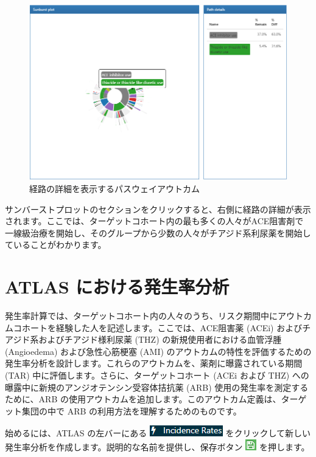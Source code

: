 \documentclass[
  11pt]{book}
\theoremstyle{definition}
\theoremstyle{definition}
\theoremstyle{definition}
\theoremstyle{definition}
\theoremstyle{remark}
\begin{document}
\begin{figure}

{\centering \includegraphics[width=1\linewidth]{images/Characterization/atlasPathwaysResultsPathDetails} 

}

\caption{経路の詳細を表示するパスウェイアウトカム}\label{fig:atlasPathwaysResultsPathDetails}
\end{figure}

サンバーストプロットのセクションをクリックすると、右側に経路の詳細が表示されます。ここでは、ターゲットコホート内の最も多くの人々がACE阻害剤で一線級治療を開始し、そのグループから少数の人々がチアジド系利尿薬を開始していることがわかります。

\section{ATLAS における発生率分析}\label{atlas-ux306bux304aux3051ux308bux767aux751fux7387ux5206ux6790}

発生率計算では、ターゲットコホート内の人々のうち、リスク期間中にアウトカムコホートを経験した人を記述します。ここでは、ACE阻害薬 (ACEi) およびチアジド系およびチアジド様利尿薬 (THZ) の新規使用者における血管浮腫 (Angioedema) および急性心筋梗塞 (AMI) のアウトカムの特性を評価するための発生率分析を設計します。これらのアウトカムを、薬剤に曝露されている期間 (TAR) 中に評価します。さらに、ターゲットコホート (ACEi および THZ) への曝露中に新規のアンジオテンシン受容体拮抗薬 (ARB) 使用の発生率を測定するために、ARB の使用アウトカムを追加します。このアウトカム定義は、ターゲット集団の中で ARB の利用方法を理解するためのものです。

始めるには、ATLAS の左バーにある \includegraphics{images/Characterization/atlasIncidenceMenuItem.png} をクリックして新しい発生率分析を作成します。説明的な名前を提供し、保存ボタン \includegraphics{images/PopulationLevelEstimation/save.png} を押します。
\end{document}
